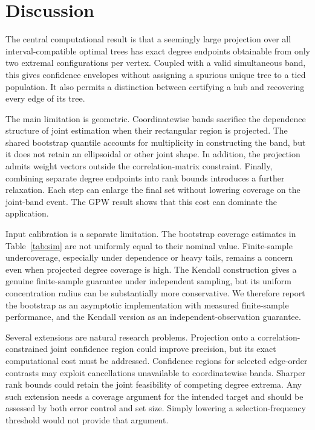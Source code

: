 \documentclass[pdflatex,sn-mathphys-ay]{sn-jnl}
\theoremstyle{thmstyleone}
\theoremstyle{thmstyletwo}
\begin{document}
\section{Discussion}\label{sec:discussion}
The central computational result is that a seemingly large projection over all interval-compatible optimal trees has exact degree endpoints obtainable from only two extremal configurations per vertex. Coupled with a valid simultaneous band, this gives confidence envelopes without assigning a spurious unique tree to a tied population. It also permits a distinction between certifying a hub and recovering every edge of its tree.

The main limitation is geometric. Coordinatewise bands sacrifice the dependence structure of joint estimation when their rectangular region is projected. The shared bootstrap quantile accounts for multiplicity in constructing the band, but it does not retain an ellipsoidal or other joint shape. In addition, the projection admits weight vectors outside the correlation-matrix constraint. Finally, combining separate degree endpoints into rank bounds introduces a further relaxation. Each step can enlarge the final set without lowering coverage on the joint-band event. The GPW result shows that this cost can dominate the application.

Input calibration is a separate limitation. The bootstrap coverage estimates in Table~\ref{tab:sim} are not uniformly equal to their nominal value. Finite-sample undercoverage, especially under dependence or heavy tails, remains a concern even when projected degree coverage is high. The Kendall construction gives a genuine finite-sample guarantee under independent sampling, but its uniform concentration radius can be substantially more conservative. We therefore report the bootstrap as an asymptotic implementation with measured finite-sample performance, and the Kendall version as an independent-observation guarantee.

Several extensions are natural research problems. Projection onto a correlation-constrained joint confidence region could improve precision, but its exact computational cost must be addressed. Confidence regions for selected edge-order contrasts may exploit cancellations unavailable to coordinatewise bands. Sharper rank bounds could retain the joint feasibility of competing degree extrema. Any such extension needs a coverage argument for the intended target and should be assessed by both error control and set size. Simply lowering a selection-frequency threshold would not provide that argument.
\end{document}
